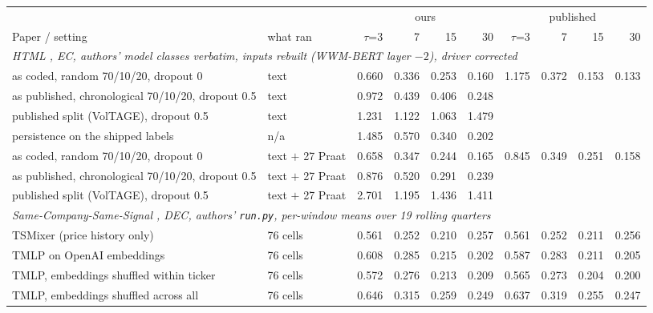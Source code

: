 \begin{table}[t]
\centering
\scriptsize
\setlength{\tabcolsep}{3pt}
\begin{tabular}{llrrrrrrrr}
\toprule
& & \multicolumn{4}{c}{ours} & \multicolumn{4}{c}{published} \\
\cmidrule(lr){3-6} \cmidrule(lr){7-10}
Paper / setting & what ran & $\tau$=3 & 7 & 15 & 30 & $\tau$=3 & 7 & 15 & 30 \\
\midrule
\multicolumn{10}{l}{\textit{HTML \citep{yang2020html}, EC, authors' model classes verbatim, inputs rebuilt (WWM-BERT layer $-2$), driver corrected}} \\
\quad as coded, random 70/10/20, dropout 0 & text & 0.660 & 0.336 & 0.253 & 0.160 & 1.175 & 0.372 & 0.153 & 0.133 \\
\quad as published, chronological 70/10/20, dropout 0.5 & text & 0.972 & 0.439 & 0.406 & 0.248 & & & & \\
\quad published split (VolTAGE), dropout 0.5 & text & 1.231 & 1.122 & 1.063 & 1.479 & & & & \\
\quad persistence on the shipped labels & n/a & 1.485 & 0.570 & 0.340 & 0.202 & & & & \\
\quad as coded, random 70/10/20, dropout 0 & text $+$ 27 Praat & 0.658 & 0.347 & 0.244 & 0.165 & 0.845 & 0.349 & 0.251 & 0.158 \\
\quad as published, chronological 70/10/20, dropout 0.5 & text $+$ 27 Praat & 0.876 & 0.520 & 0.291 & 0.239 & & & & \\
\quad published split (VolTAGE), dropout 0.5 & text $+$ 27 Praat & 2.701 & 1.195 & 1.436 & 1.411 & & & & \\
\midrule
\multicolumn{10}{l}{\textit{Same-Company-Same-Signal \citep{scss2024}, DEC, authors' \texttt{run.py}, per-window means over 19 rolling quarters}} \\
\quad TSMixer (price history only) & 76 cells & 0.561 & 0.252 & 0.210 & 0.257 & 0.561 & 0.252 & 0.211 & 0.256 \\
\quad TMLP on OpenAI embeddings & 76 cells & 0.608 & 0.285 & 0.215 & 0.202 & 0.587 & 0.283 & 0.211 & 0.205 \\
\quad TMLP, embeddings shuffled within ticker & 76 cells & 0.572 & 0.276 & 0.213 & 0.209 & 0.565 & 0.273 & 0.204 & 0.200 \\
\quad TMLP, embeddings shuffled across all & 76 cells & 0.646 & 0.315 & 0.259 & 0.249 & 0.637 & 0.319 & 0.255 & 0.247 \\

\end{tabular}
\end{table}
